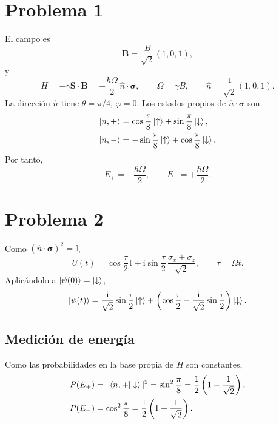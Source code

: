 \documentclass[11pt,a4paper]{article}
\numberwithin{equation}{section}
\renewcommand{\boxed}[1]{#1}
\newcommand{\ii}{\mathrm i}
\newcommand{\hb}{\hbar}
\newcommand{\id}{\mathbb I}
\begin{document}
\section{Problema 1}
El campo es
\begin{equation}
\bm B=\frac{B}{\sqrt2}(1,0,1),
\end{equation}
y
\begin{equation}
H=-\gamma\bm S\cdot\bm B
=-\frac{\hb\Omega}{2}\,\hat n\cdot\bm\sigma,
\qquad \Omega=\gamma B,
\qquad \hat n=\frac1{\sqrt2}(1,0,1).
\end{equation}
La dirección $\hat n$ tiene $\theta=\pi/4$, $\varphi=0$. Los estados propios de $\hat n\cdot\bm\sigma$ son
\begin{align}
\ket{n,+}&=\cos\frac\pi8\ket\uparrow+\sin\frac\pi8\ket\downarrow,\\
\ket{n,-}&=-\sin\frac\pi8\ket\uparrow+\cos\frac\pi8\ket\downarrow.
\end{align}
Por tanto,
\begin{equation}
\boxed{E_+=-\frac{\hb\Omega}{2},\qquad E_-=+\frac{\hb\Omega}{2}.}
\end{equation}

\section{Problema 2}
Como $(\hat n\cdot\bm\sigma)^2=\id$,
\begin{equation}
\boxed{U(t)=\cos\frac\tau2\,\id+\ii\sin\frac\tau2\,\frac{\sigma_x+\sigma_z}{\sqrt2},\qquad \tau=\Omega t.}
\end{equation}
Aplicándolo a $\ket{\psi(0)}=\ket\downarrow$,
\begin{equation}
\boxed{\ket{\psi(t)}=
\frac{\ii}{\sqrt2}\sin\frac\tau2\ket\uparrow+
\left(\cos\frac\tau2-\frac{\ii}{\sqrt2}\sin\frac\tau2\right)\ket\downarrow.}
\end{equation}

\subsection{Medición de energía}
Como las probabilidades en la base propia de $H$ son constantes,
\begin{align}
P(E_+)&=|\braket{n,+|\downarrow}|^2=\sin^2\frac\pi8
=\frac12\left(1-\frac1{\sqrt2}\right),\\
P(E_-)&=\cos^2\frac\pi8
=\frac12\left(1+\frac1{\sqrt2}\right).
\end{align}
\end{document}
